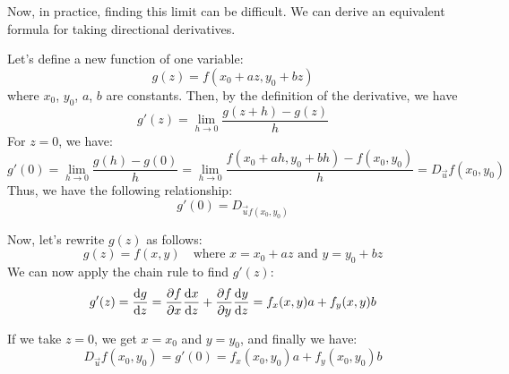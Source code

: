 Now, in practice, finding this limit can be difficult. We can derive an equivalent formula for taking directional derivatives.

Let's define a new function of one variable: \[ 
    g(z) = f(x_0+az, y_0+bz)
\]
where $x_0$, $y_0$, $a$, $b$ are constants. Then, by the definition of the derivative, we have \[ 
    g'(z) = \lim_{h \to 0} \frac{g(z+h) - g(z)}{h}
\]
For $z=0$, we have: \[
    g'(0) = \lim_{h \to 0} \frac{g(h)-g(0)}{h} = \lim_{h \to 0} \frac{f(x_0+ah, y_0+bh) - f(x_0,y_0)}{h} = D_{\vec{u}} f(x_0,y_0)
\]
Thus, we have the following relationship: \[ 
    g'(0) = D_{\vec{u} f(x_0,y_0)}
\]

Now, let's rewrite $g(z)$ as follows: \[ 
    g(z) = f(x,y) \quad \text{where } x = x_0 + az \text{ and } y = y_0 + bz
\]
We can now apply the chain rule to find $g'(z)$: \[ 
    g'(z) = \dv{g}{z} = \pdv{f}{x} \dv{x}{z} + \pdv{f}{y} \dv{y}{z} = f_x(x,y) a + f_y(x,y) b
\]

If we take $z=0$, we get $x=x_0$ and $y=y_0$, and finally we have: \[ 
    D_{\vec{u}} f(x_0,y_0) = g'(0) = f_x(x_0,y_0) a + f_y(x_0,y_0) b
\]

\Note{
    \[ D_{\vec{u}} f(x,y) = f_x(x,y) a + f_y(x,y) b \]
    \[ D_{\vec{u}} f(x,y,z) = f_x(x,y,z)a + f_y(x,y,z)b + f_z(x,y,z)c \]
}

